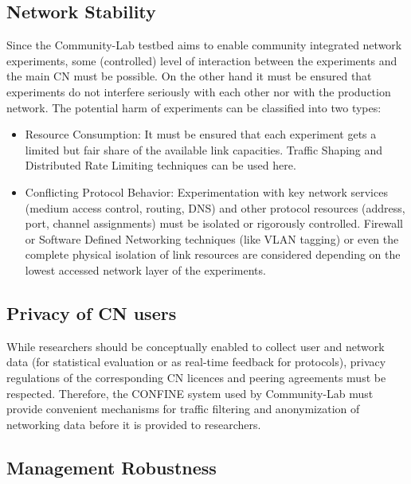 \documentclass[conference]{IEEEtran}
\begin{document}
\subsection{Network Stability}
Since the Community-Lab testbed aims to enable community integrated network
experiments, some (controlled) level of interaction between the
experiments and the main CN must be possible. On the other hand it
must be ensured that experiments do not interfere seriously with each
other nor with the production network.  The potential harm of
experiments can be classified into two types:

\begin{itemize}

\item Resource Consumption: It must be ensured that each experiment
  gets a limited but fair share of the available link capacities.
  Traffic Shaping and Distributed Rate Limiting techniques can be used
  here.

\item Conflicting Protocol Behavior: Experimentation with key network
  services (medium access control, routing, DNS) and other protocol
  resources (address, port, channel assignments) must be isolated or
  rigorously controlled.  Firewall or Software Defined Networking
  techniques (like VLAN tagging) or even the complete physical
  isolation of link resources are considered depending on the lowest
  accessed network layer of the experiments.

\end{itemize}

\subsection{Privacy of CN users}

While researchers should be conceptually enabled to collect user
and network data (for statistical evaluation or as real-time feedback
for protocols), privacy regulations of the corresponding CN licences
and peering agreements must be respected.
Therefore, the CONFINE system used by Community-Lab must provide convenient mechanisms for
traffic filtering and anonymization of networking data before it is
provided to researchers.

\subsection{Management Robustness}
\end{document}
